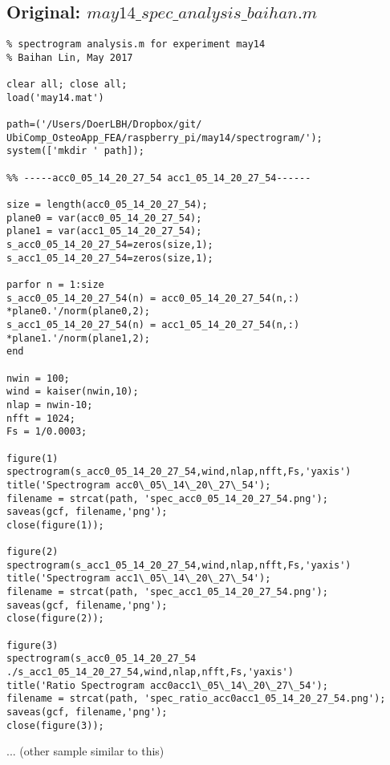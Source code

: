 \documentclass{sigchi}
\begin{document}
\subsection{Original: $may14\_spec\_analysis\_baihan.m$}\label{ss:spc_ana.m}
\begin{lstlisting}
% spectrogram analysis.m for experiment may14 
% Baihan Lin, May 2017

clear all; close all;
load('may14.mat')

path=('/Users/DoerLBH/Dropbox/git/
UbiComp_OsteoApp_FEA/raspberry_pi/may14/spectrogram/');
system(['mkdir ' path]);

%% -----acc0_05_14_20_27_54 acc1_05_14_20_27_54------

size = length(acc0_05_14_20_27_54);
plane0 = var(acc0_05_14_20_27_54);
plane1 = var(acc1_05_14_20_27_54);
s_acc0_05_14_20_27_54=zeros(size,1);
s_acc1_05_14_20_27_54=zeros(size,1);

parfor n = 1:size
s_acc0_05_14_20_27_54(n) = acc0_05_14_20_27_54(n,:)
*plane0.'/norm(plane0,2);
s_acc1_05_14_20_27_54(n) = acc1_05_14_20_27_54(n,:)
*plane1.'/norm(plane1,2);
end

nwin = 100;
wind = kaiser(nwin,10);
nlap = nwin-10;
nfft = 1024;
Fs = 1/0.0003;

figure(1)
spectrogram(s_acc0_05_14_20_27_54,wind,nlap,nfft,Fs,'yaxis')
title('Spectrogram acc0\_05\_14\_20\_27\_54');
filename = strcat(path, 'spec_acc0_05_14_20_27_54.png');
saveas(gcf, filename,'png');
close(figure(1));

figure(2)
spectrogram(s_acc1_05_14_20_27_54,wind,nlap,nfft,Fs,'yaxis')
title('Spectrogram acc1\_05\_14\_20\_27\_54');
filename = strcat(path, 'spec_acc1_05_14_20_27_54.png');
saveas(gcf, filename,'png');
close(figure(2));

figure(3)
spectrogram(s_acc0_05_14_20_27_54
./s_acc1_05_14_20_27_54,wind,nlap,nfft,Fs,'yaxis')
title('Ratio Spectrogram acc0acc1\_05\_14\_20\_27\_54');
filename = strcat(path, 'spec_ratio_acc0acc1_05_14_20_27_54.png');
saveas(gcf, filename,'png');
close(figure(3));
\end{lstlisting}
... (other sample similar to this)
\end{document}
